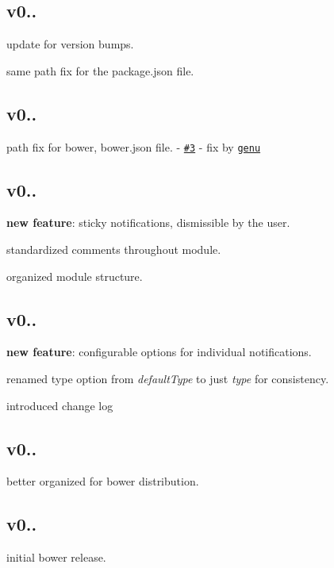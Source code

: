 \subsection*{v0..}


\begin{DoxyItemize}
\item update for version bumps.
\item same path fix for the package.\+json file.
\end{DoxyItemize}

\subsection*{v0..}


\begin{DoxyItemize}
\item path fix for bower, bower.\+json file. -\/ \href{https://github.com/matowens/ng-notify/pull/3/files}{\tt \#3} -\/ fix by \href{https://github.com/genu}{\tt genu}
\end{DoxyItemize}

\subsection*{v0..}


\begin{DoxyItemize}
\item {\bfseries new feature}\+: sticky notifications, dismissible by the user.
\item standardized comments throughout module.
\item organized module structure.
\end{DoxyItemize}

\subsection*{v0..}


\begin{DoxyItemize}
\item {\bfseries new feature}\+: configurable options for individual notifications.
\item renamed type option from {\itshape default\+Type} to just {\itshape type} for consistency.
\item introduced change log
\end{DoxyItemize}

\subsection*{v0..}


\begin{DoxyItemize}
\item better organized for bower distribution.
\end{DoxyItemize}

\subsection*{v0..}


\begin{DoxyItemize}
\item initial bower release. 
\end{DoxyItemize}